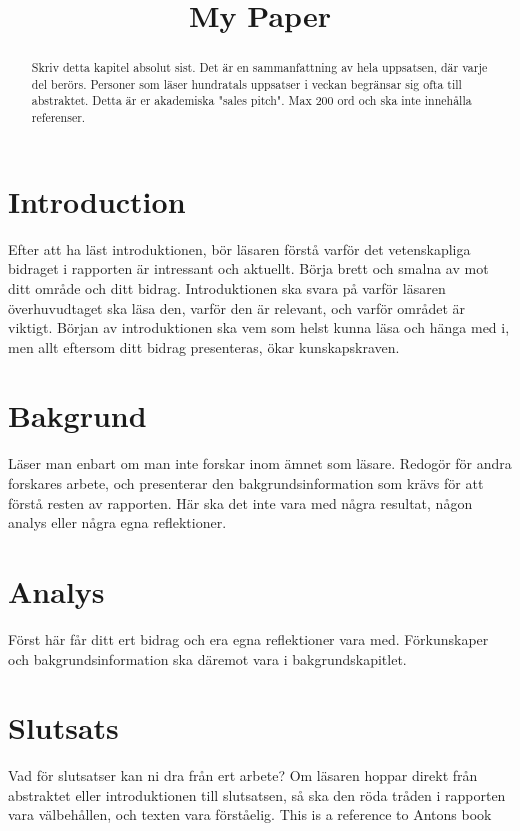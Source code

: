 \documentclass[conference,a4paper]{IEEEtran}
\begin{document}
\title{My Paper}
\author{
}
\maketitle
\begin{abstract}
Skriv detta kapitel absolut sist. Det är en sammanfattning av hela uppsatsen,
där varje del berörs. Personer som läser hundratals uppsatser i veckan begränsar
sig ofta till abstraktet. Detta är er akademiska "sales pitch". Max 200 ord och ska
inte innehålla referenser.
\end{abstract}
\section{Introduction}
Efter att ha läst introduktionen, bör läsaren förstå varför det vetenskapliga
bidraget i rapporten är intressant och aktuellt. Börja brett och smalna av mot ditt
område och ditt bidrag. Introduktionen ska svara på varför läsaren överhuvudtaget
ska läsa den, varför den är relevant, och varför området är viktigt. Början av
introduktionen ska vem som helst kunna läsa och hänga med i, men allt eftersom ditt
bidrag presenteras, ökar kunskapskraven.
\section{Bakgrund}
Läser man enbart om man inte forskar inom ämnet som läsare. Redogör för andra
forskares arbete, och presenterar den bakgrundsinformation som krävs för att förstå
resten av rapporten. Här ska det inte vara med några resultat, någon analys eller
några egna reflektioner.
\section{Analys}
Först här får ditt ert bidrag och era egna reflektioner vara med. Förkunskaper och
bakgrundsinformation ska däremot vara i bakgrundskapitlet.
\section{Slutsats}
Vad för slutsatser kan ni dra från ert arbete? Om läsaren hoppar direkt från
abstraktet eller introduktionen till slutsatsen, så ska den röda tråden i rapporten
vara välbehållen, och texten vara förståelig.
This is a reference to Antons book \cite{ref1}
\end{document}
